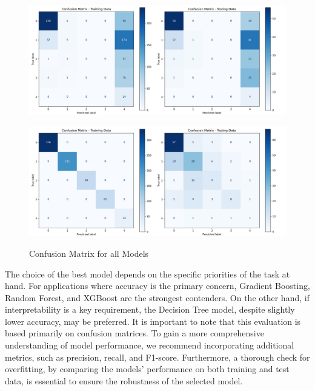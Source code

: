 \documentclass[pdflatex,sn-nature,Numbered]{sn-jnl}%
\theoremstyle{thmstyleone}%
\theoremstyle{thmstyletwo}%
\theoremstyle{thmstylethree}%
\begin{document}
\begin{figure}[htbp]
\begin{minipage}{0.45\textwidth}
    \centering
    \includegraphics[width=\linewidth]{files/gau1.png}
    \label{fig:image7}
\end{minipage}%
\hfill
\begin{minipage}{0.45\textwidth}
    \centering
    \includegraphics[width=\linewidth]{files/xgb1.png}
    \label{fig:image8}
\end{minipage}

\caption{Confusion Matrix for all Models}
\end{figure}


The choice of the best model depends on the specific priorities of the task at hand. For applications where accuracy is the primary concern, Gradient Boosting, Random Forest, and XGBoost are the strongest contenders. On the other hand, if interpretability is a key requirement, the Decision Tree model, despite slightly lower accuracy, may be preferred. It is important to note that this evaluation is based primarily on confusion matrices. To gain a more comprehensive understanding of model performance, we recommend incorporating additional metrics, such as precision, recall, and F1-score. Furthermore, a thorough check for overfitting, by comparing the models' performance on both training and test data, is essential to ensure the robustness of the selected model.
\end{document}
